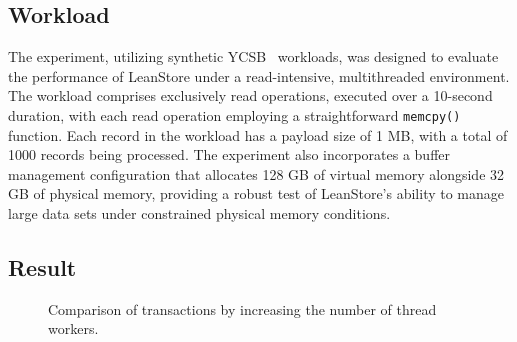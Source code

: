 \subsection{Workload}

The experiment, utilizing synthetic YCSB~\parencite{cooper2010benchmarking} workloads, was designed to evaluate the performance of LeanStore under a read-intensive, multithreaded environment. The workload comprises exclusively read operations, executed over a 10-second duration, with each read operation employing a straightforward \texttt{memcpy()} function. Each record in the workload has a payload size of 1 MB, with a total of 1000 records being processed. The experiment also incorporates a buffer management configuration that allocates 128 GB of virtual memory alongside 32 GB of physical memory, providing a robust test of LeanStore's ability to manage large data sets under constrained physical memory conditions.

\subsection{Result}

\begin{figure}[H]
    \centering
    \caption{Comparison of transactions by increasing the number of thread workers.}
    \label{fig:txn_comparison}
\end{figure}

